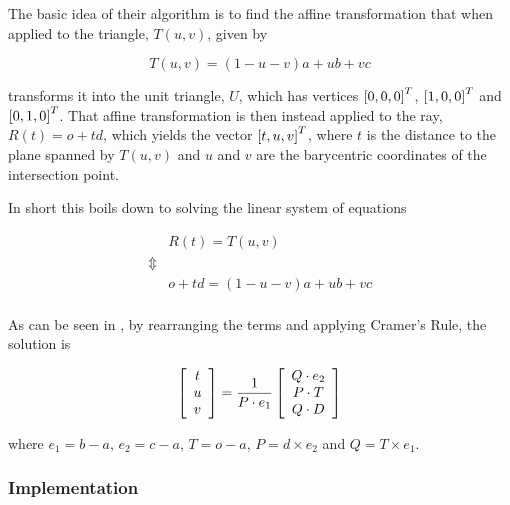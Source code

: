 

The basic idea of their algorithm is to find the affine transformation
that when applied to the triangle, $T(u,v)$, given by

\begin{displaymath}
  T(u,v) = (1-u-v)a + ub + vc
\end{displaymath}

transforms it into the unit triangle, $U$, which has vertices
$\left[0, 0, 0 \right]^T$, $\left[1, 0, 0 \right]^T$ and
$\left[0, 1, 0 \right]^T$. That affine transformation is then instead
applied to the ray, $R(t) = o + td$, which yields the vector
$\left[t, u, v \right]^T$, where $t$ is the distance to the plane spanned
by $T(u,v)$ and $u$ and $v$ are the barycentric coordinates of the
intersection point.

In short this boils down to solving the linear system of equations

\begin{displaymath}
  \begin{array}{rl}
    & R(t) = T(u,v) \\
    \Updownarrow \\
    & o + td = (1-u-v)a + ub + vc \\
  \end{array}
\end{displaymath}

As can be seen in , by rearranging the
terms and applying Cramer's Rule, the solution is

\begin{displaymath}
  \left[\begin{array}{c} t \\ u \\ v \end{array}\right] = \frac{1}{P \cdot e_1} 
  \left[\begin{array}{c} Q \cdot e_2 \\ P \cdot T \\ Q \cdot D \end{array}\right]
\end{displaymath}

where $e_1 = b - a$, $e_2 = c - a$, $T = o - a$, $P = d \times  e_2$
and $Q = T \times  e_1$.

\subsubsection{Implementation}


